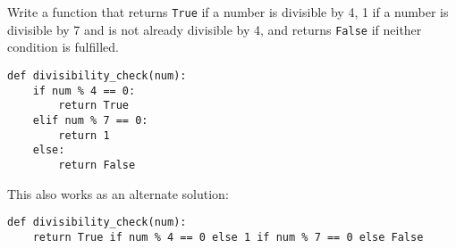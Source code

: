 \begin{blocksection}
\question Write a function that returns \lstinline{True} if a number is divisible by 4, 1 if a number is divisible by 7 and is not already divisible by 4, and returns \lstinline{False} if neither condition is fulfilled.








\begin{solution}[1in]
\begin{lstlisting}
def divisibility_check(num):
    if num % 4 == 0:
        return True
    elif num % 7 == 0:
        return 1
    else:
        return False
\end{lstlisting}
This also works as an alternate solution:
\begin{lstlisting}
def divisibility_check(num):
    return True if num % 4 == 0 else 1 if num % 7 == 0 else False
\end{lstlisting}
\end{solution}
\end{blocksection}
